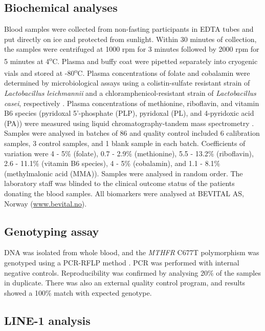 \subsection{Biochemical analyses} %
\noindent Blood samples were collected from non-fasting participants in EDTA tubes and put directly on ice and protected from sunlight. Within 30 minutes of collection, the samples were centrifuged at 1000 rpm for 3 minutes followed by 2000 rpm for 5 minutes at 4\textsuperscript{o}C. Plasma and buffy coat were pipetted separately into cryogenic vials and stored at -80\textsuperscript{o}C. Plasma concentrations of folate and cobalamin were determined by microbiological assays using a colistin-sulfate resistant strain of \emph{Lactobacillus leichmannii} and a chloramphenicol-resistant strain of \emph{Lactobacillus casei}, respectively \cite{c545,c546}. Plasma concentrations of methionine, riboflavin, and vitamin B6 species (pyridoxal 5'-phosphate (PLP), pyridoxal (PL), and 4-pyridoxic acid (PA)) were measured using liquid chromatography-tandem mass spectrometry \cite{c547,c548}. Samples were analysed in batches of 86 and quality control included 6 calibration samples, 3 control samples, and 1 blank sample in each batch. Coefficients of variation were 4 - 5\% (folate), 0.7 - 2.9\% (methionine), 5.5 - 13.2\% (riboflavin), 2.6 - 11.1\% (vitamin B6 species), 4 - 5\% (cobalamin), and 1.1 - 8.1\% (methylmalonic acid (MMA)). Samples were analysed in random order. The laboratory staff was blinded to the clinical outcome status of the patients donating the blood samples. All biomarkers were analysed at BEVITAL AS, Norway (\href{www.bevital.no}{www.bevital.no}).

\subsection{Genotyping assay} %
\noindent DNA was isolated from whole blood, and the \emph{MTHFR} C677T polymorphism was genotyped using a PCR-RFLP method \cite{c549}. PCR was performed with internal negative controls. Reproducibility was confirmed by analysing 20\% of the samples in duplicate. There was also an external quality control program, and results showed a 100\% match with expected genotype. 

\subsection{LINE-1 analysis} %
